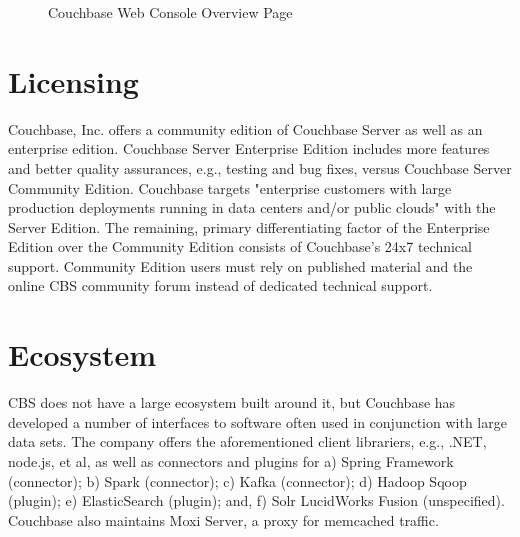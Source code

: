 \documentclass[9pt,twocolumn,twoside]{styles/osajnl}
\begin{document}
\begin{figure}[htbp]
\centering
{}
\caption{Couchbase Web Console Overview Page \cite{www-webconsole-cbsinc}}
\label{fig:web gui overview}
\end{figure}

\section{Licensing}

Couchbase, Inc. offers a community edition of Couchbase
Server as well as an enterprise edition.  Couchbase Server Enterprise Edition
includes more features and better quality assurances, e.g., testing and bug
fixes, versus Couchbase Server Community Edition.  Couchbase targets
"enterprise customers with large production deployments running in data centers
and/or public clouds" with the Server Edition. The remaining, primary differentiating factor of the Enterprise Edition over the Community Edition consists of Couchbase's 24x7 technical support. Community Edition users must rely on published material and the online CBS community forum instead of dedicated technical support.  \cite{www-downloads-cbsinc}

\section{Ecosystem} CBS does not have a large ecosystem built around it,
but Couchbase has developed a number of interfaces to software often used in conjunction with large data sets.  The
company offers the aforementioned client librariers, e.g., .NET, node.js, et al, as well as connectors and plugins for a) Spring Framework (connector); b) Spark (connector); c) Kafka (connector); d) Hadoop Sqoop (plugin); e) ElasticSearch (plugin); and, f) Solr LucidWorks Fusion (unspecified).  Couchbase also maintains Moxi Server, a proxy for memcached traffic.\cite{www-downloads-cbsinc}
\end{document}
